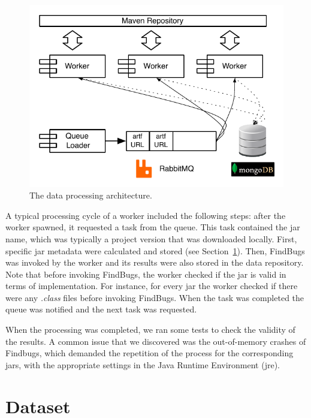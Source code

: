 \documentclass{sig-alternate}
\begin{document}
\begin{figure}[t]
  \begin{center}
    \includegraphics[scale=0.73]{figures/arch.pdf}
  \end{center}
  \caption{The data processing architecture.}
  \label{fig:arch}
\end{figure}

A typical processing cycle of a worker included the
following steps: after the worker spawned, it requested a task
from the queue. This task contained the {\sc jar} name, which
was typically a project version that was downloaded locally.
First, specific {\sc jar} metadata were calculated and stored
(see Section~\ref{sec:data}).
Then, FindBugs was invoked
by the worker and its results were also stored in the data
repository.
Note that before invoking FindBugs,
the worker checked if the {\sc jar} is valid in terms of implementation.
For instance, for every {\sc jar} the worker checked
if there were any {\it .class} files before invoking FindBugs.
When the task was completed
the queue was notified and the next task was requested.

When the processing was completed, we ran some tests
to check the validity of the results.
A common issue that we discovered was the out-of-memory
crashes of Findbugs, which demanded the repetition of the process
for the corresponding {\sc jar}s, with the appropriate
settings in the Java Runtime Environment ({\sc jre}).

\section{Dataset}
\label{sec:data}
\end{document}
